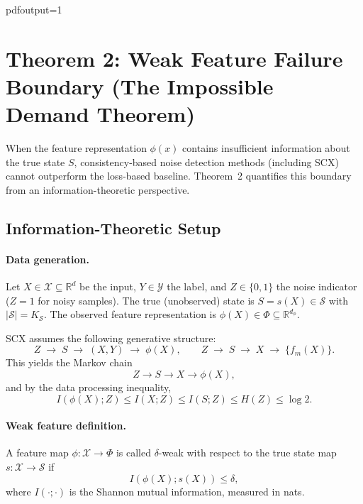 pdfoutput=1

\section{Theorem 2: Weak Feature Failure Boundary (The Impossible Demand Theorem)}
\label{sec:thm2}

When the feature representation $\phi(x)$ contains insufficient information
about the true state $S$, consistency-based noise detection methods
(including SCX) cannot outperform the loss-based baseline. Theorem~2
quantifies this boundary from an information-theoretic perspective.

\subsection{Information-Theoretic Setup}
\label{sec:thm2:setup}

\paragraph{Data generation.}
Let $X \in \mathcal{X} \subseteq \mathbb{R}^d$ be the input, $Y \in \mathcal{Y}$
the label, and $Z \in \{0,1\}$ the noise indicator ($Z=1$ for noisy samples).
The true (unobserved) state is $S = s(X) \in \mathcal{S}$ with
$|\mathcal{S}| = K_{\mathcal{S}}$. The observed feature representation is
$\phi(X) \in \Phi \subseteq \mathbb{R}^{d_\phi}$.

SCX assumes the following generative structure:
\[
Z \;\to\; S \;\to\; (X, Y) \;\to\; \phi(X),
\qquad
Z \;\to\; S \;\to\; X \;\to\; \{f_m(X)\}.
\]
This yields the Markov chain
\begin{equation}
Z \to S \to X \to \phi(X),
\label{eq:markov-chain}
\end{equation}
and by the data processing inequality,
\[
I(\phi(X); Z) \leq I(X; Z) \leq I(S; Z) \leq H(Z) \leq \log 2.
\]

\paragraph{Weak feature definition.}

\begin{definition}
\label{def:weak-feature}
A feature map $\phi: \mathcal{X} \to \Phi$ is called $\delta$-weak with respect
to the true state map $s: \mathcal{X} \to \mathcal{S}$ if
\begin{equation}
I(\phi(X); s(X)) \leq \delta,
\label{eq:weak-feature}
\end{equation}
where $I(\cdot;\cdot)$ is the Shannon mutual information, measured in nats.
\end{definition}

